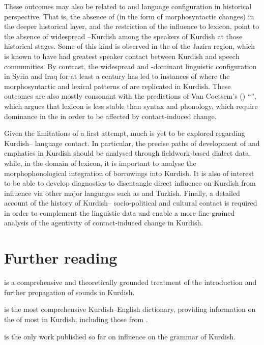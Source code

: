 \documentclass[output=paper]{langsci/langscibook}
\begin{document}
These outcomes may also be related to  and language configuration in historical perspective. That is, the absence of  (in the form of morphosyntactic changes) in the deeper historical layer, and the restriction of the influence to lexicon, point to the absence of widespread –Kurdish  among the speakers of Kurdish at those historical stages. Some  of this kind is observed in the  of the Jazira region, which is known to have had greatest speaker contact between Kurdish and  speech communities. By contrast, the widespread  and -dominant linguistic configuration in Syria and Iraq for at least a century has led to instances of  where the morphosyntactic and lexical patterns of  are replicated in Kurdish. These outcomes are also mostly consonant with the predictions of Van Coetsem’s (\citeyear{VanCoetsem1988,VanCoetsem2000}) “”, which argues that lexicon is less stable than syntax and phonology, which require dominance in the  in order to be affected by contact-induced change.    

Given the limitations of a first attempt, much is yet to be explored regarding Kurdish– language contact. In particular, the precise paths of development of  and emphatics in Kurdish should be analysed through fieldwork-based  dialect data, while, in the domain of lexicon, it is important to analyse the morphophonological integration of borrowings into Kurdish. It is also of interest to be able to develop diagnostics to disentangle direct  influence on Kurdish from influence via other major languages such as  and  {Turkish}. Finally, a detailed account of the history of Kurdish– socio-political and cultural contact is required in order to complement the linguistic data and enable a more fine-grained analysis of the agentivity of contact-induced change in Kurdish.      

\section*{Further reading}
\begin{furtherreading}
\item[\citet{Barryforthcoming}] is a comprehensive and theoretically grounded treatment of the introduction and further propagation of  sounds in Kurdish. 
\item[\citet{Chyet2003}] is the most comprehensive Kurdish–English dictionary,  providing information on the  of most  in Kurdish, including those from .
\item[\citet{Tsabolov1994}] is the only work published so far on  influence on the grammar of Kurdish. 
\end{furtherreading}
\end{document}
